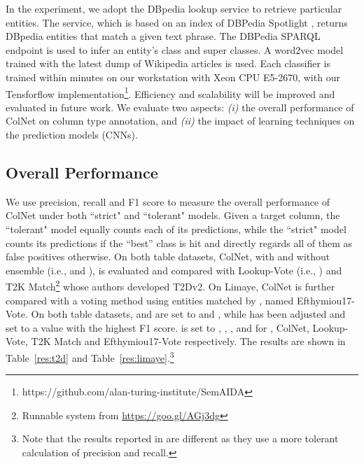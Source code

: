 \documentclass[letterpaper]{article}
\newcommand{\rv}[1]{{\color{black}#1}}
\newcommand{\camera}[1]{{\color{black}#1}}
\newcommand{\ColNet}{\textsf{ColNet}\xspace}
\begin{document}
In the experiment, 
we adopt the DBpedia lookup service
to retrieve particular entities. 
The service, which is based on an index of DBPedia Spotlight \cite{mendes2011dbpedia},
returns DBpedia entities that match a given text phrase. The
DBPedia SPARQL endpoint is used to infer an entity's class and super classes.
\camera{A word2vec model trained with the latest dump of Wikipedia articles is used.
Each classifier is trained within  minutes on our workstation with Xeon CPU E5-2670, with our Tensforflow implementation\footnote{https://github.com/alan-turing-institute/SemAIDA}.
Efficiency and scalability will be improved and evaluated in future work.
}
\camera{We evaluate} two aspects:
\textit{(i)} the overall performance of \ColNet on column type annotation, 
and \textit{(ii)} the impact of learning techniques on the prediction models (CNNs).

\subsection{Overall Performance}
We use precision, recall and F1 score to measure the overall performance of \ColNet 
under both ``strict" and ``tolerant" models. 
Given a target column, 
the ``tolerant" model equally counts each of its predictions,
\rv{while the ``strict" model counts its predictions if the ``best'' class is hit and directly regards all of them as false positives otherwise.}
On both table datasets, \ColNet, with and without ensemble (i.e.,  and ), is evaluated and compared with Lookup-Vote (i.e., ) and
T2K Match\footnote{Runnable system from \url{https://goo.gl/AGj3dg}} 
\cite{ritze2015matching} whose authors developed T2Dv2.
\rv{
On Limaye,
\ColNet is further compared with a voting method using entities matched by \cite{efthymiou2017matching}, named Efthymiou17-Vote.}
\rv{On both table datasets,  and  are set to  and ,
while  has been adjusted and set to a value with the highest F1 score.
 is set to , , ,  and  for , \ColNet, Lookup-Vote, T2K Match and Efthymiou17-Vote respectively.
The results are shown in Table~\ref{res:t2d} and Table~\ref{res:limaye}.\footnote{Note that the results reported in \cite{ritze2017web} are different as they use a more tolerant calculation of precision and recall.}
}
\end{document}
